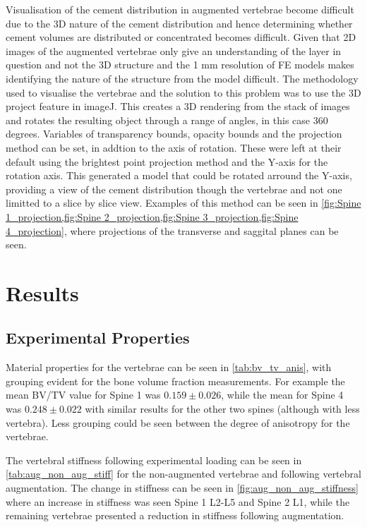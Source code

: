 Visualisation of the cement distribution in augmented vertebrae become
difficult due to the 3D nature of the cement distribution and hence determining
whether cement volumes are distributed or concentrated becomes difficult.
Given that 2D images of the augmented vertebrae only give an understanding of
the layer in question and not the 3D structure and the 1 mm resolution of FE
models makes identifying the nature of the structure from the model difficult.
The methodology used to visualise the vertebrae and the solution to this
problem was to use the 3D project feature in imageJ. This creates a 3D
rendering from the stack of images and rotates the resulting object through a
range of angles, in this case 360 degrees. Variables of transparency bounds,
opacity bounds and the projection method can be set, in addtion to the axis of
rotation. These were left at their default using the brightest point projection
method and the Y-axis for the rotation axis. This generated a model that could
be rotated arround the Y-axis, providing a view of the cement distribution
though the vertebrae and not one limitted to a slice by slice view. Examples of
this method can be seen in \cref{fig:Spine 1_projection,fig:Spine
2_projection,fig:Spine 3_projection,fig:Spine 4_projection}, where projections of the
transverse and saggital planes can be seen. 



\section{Results}


\subsection{Experimental Properties}\label{sec:aug_stiffness_res}

Material properties for the vertebrae can be seen in \cref{tab:bv_tv_anis},
with grouping evident for the bone volume fraction measurements.
For example the mean BV/TV value for Spine 1 was $0.159 \pm 0.026$, while the
mean for Spine 4 was $0.248 \pm 0.022$ with similar results for the other two
spines (although with less vertebra).
Less grouping could be seen between the degree of anisotropy for the vertebrae.

The vertebral stiffness following experimental loading can be seen in
\cref{tab:aug_non_aug_stiff} for the non-augmented vertebrae and following
vertebral augmentation.
The change in stiffness can be seen in \cref{fig:aug_non_aug_stiffness} where
an increase in stiffness was seen Spine 1 L2-L5 and Spine 2 L1, while the
remaining vertebrae presented a reduction in stiffness following
augmentation.


